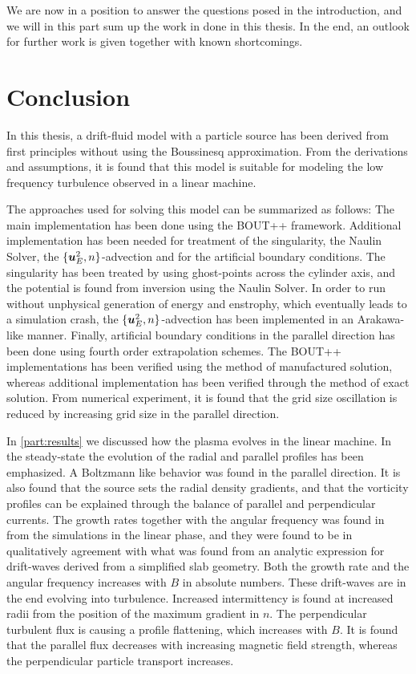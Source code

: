 %
We are now in a position to answer the questions posed in the introduction, and we will in this part sum up the work in done in this thesis.
In the end, an outlook for further work is given together with known shortcomings.

\section*{Conclusion}
%
In this thesis, a drift-fluid model with a particle source has been derived from first principles without using the Boussinesq approximation.
From the derivations and assumptions, it is found that this model is suitable for modeling the low frequency turbulence observed in a linear machine.

The approaches used for solving this model can be summarized as follows:
The main implementation has been done using the BOUT++ framework.
Additional implementation has been needed for treatment of the singularity, the Naulin Solver, the $\{\boldsymbol{u}_E^2,n\}$-advection and for the artificial boundary conditions.
The singularity has been treated by using ghost-points across the cylinder axis, and the potential is found from inversion using the Naulin Solver.
In order to run without unphysical generation of energy and enstrophy, which eventually leads to a simulation crash, the $\{\boldsymbol{u}_E^2,n\}$-advection has been implemented in an Arakawa-like manner.
Finally, artificial boundary conditions in the parallel direction has been done using fourth order extrapolation schemes.
The BOUT++ implementations has been verified using the method of manufactured solution, whereas additional implementation has been verified through the method of exact solution.
From numerical experiment, it is found that the grid size oscillation is reduced by increasing grid size in the parallel direction.

In \cref{part:results} we discussed how the plasma evolves in the linear machine.
In the steady-state the evolution of the radial and parallel profiles has been emphasized.
A Boltzmann like behavior was found in the parallel direction.
It is also found that the source sets the radial density gradients, and that the vorticity profiles can be explained through the balance of parallel and perpendicular currents.
The growth rates together with the angular frequency was found in from the simulations in the linear phase, and they were found to be in qualitatively agreement with what was found from an analytic expression for drift-waves derived from a simplified slab geometry.
Both the growth rate and the angular frequency increases with $B$ in absolute numbers.
These drift-waves are in the end evolving into turbulence.
Increased intermittency is found at increased radii from the position of the maximum gradient in $n$.
The perpendicular turbulent flux is causing a profile flattening, which increases with $B$.
It is found that the parallel flux decreases with increasing magnetic field strength, whereas the perpendicular particle transport increases.

